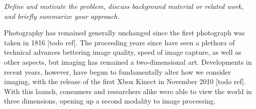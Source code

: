 
\textit{Define and motivate the problem, discuss background material or related work, and briefly summarize your approach.}

Photography has remained generally unchanged since the first photograph was
taken in 1816 [todo ref]. The proceeding years since have seen a plethora of
technical advances bettering image quality, speed of image capture, as well as
other aspects, but imaging has remained a two-dimensional art. Developments in
recent years, however, have begun to fundamentally alter how we consider
imaging, with the release of the first Xbox Kinect in November 2010 [todo ref].
With this launch, consumers and researchers alike were able to view the world in
three dimensions, opening up a second modality to image processing.


